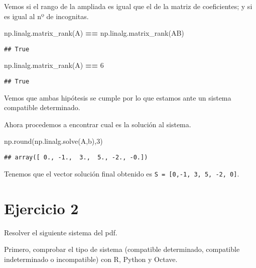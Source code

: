 \documentclass[
]{article}
\newenvironment{Shaded}{\begin{snugshade}}{\end{snugshade}}
\newcommand{\BuiltInTok}[1]{#1}
\newcommand{\DecValTok}[1]{\textcolor[rgb]{0.00,0.00,0.81}{#1}}
\newcommand{\NormalTok}[1]{#1}
\newcommand{\OperatorTok}[1]{\textcolor[rgb]{0.81,0.36,0.00}{\textbf{#1}}}
\begin{document}
Vemos si el rango de la ampliada es igual que el de la matriz de
coeficientes; y si es igual al nº de incognitas.

\begin{Shaded}
\begin{Highlighting}[]
\NormalTok{np.linalg.matrix_rank(A) }\OperatorTok{==}\NormalTok{ np.linalg.matrix_rank(AB)}
\end{Highlighting}
\end{Shaded}

\begin{verbatim}
## True
\end{verbatim}

\begin{Shaded}
\begin{Highlighting}[]
\NormalTok{np.linalg.matrix_rank(A) }\OperatorTok{==} \DecValTok{6}
\end{Highlighting}
\end{Shaded}

\begin{verbatim}
## True
\end{verbatim}

Vemos que ambas hipótesis se cumple por lo que estamos ante un sistema
compatible determinado.

Ahora procedemos a encontrar cual es la solución al sistema.

\begin{Shaded}
\begin{Highlighting}[]
\NormalTok{np.}\BuiltInTok{round}\NormalTok{(np.linalg.solve(A,b),}\DecValTok{3}\NormalTok{)}
\end{Highlighting}
\end{Shaded}

\begin{verbatim}
## array([ 0., -1.,  3.,  5., -2., -0.])
\end{verbatim}

Tenemos que el vector solución final obtenido es
\texttt{S\ =\ {[}0,-1,\ 3,\ 5,\ -2,\ 0{]}}.

\hypertarget{ejercicio-2}{%
\section{Ejercicio 2}\label{ejercicio-2}}

Resolver el siguiente sistema del pdf.

Primero, comprobar el tipo de sistema (compatible determinado,
compatible indeterminado o incompatible) con R, Python y Octave.
\end{document}
